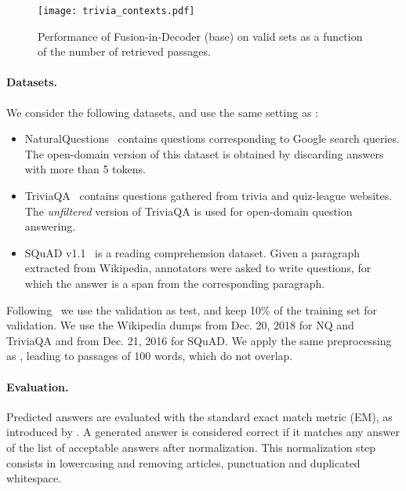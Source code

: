 \documentclass[11pt,a4paper]{article}
\begin{document}
\begin{figure*}[t]
\begin{center} 
\texttt{[image: trivia\_contexts.pdf]}
\caption{Performance of Fusion-in-Decoder (base) on valid sets as a function of the number of retrieved passages.}
\label{fig:contextscaling}
\end{center}
\end{figure*}

\paragraph{Datasets.}
We consider the following datasets, and use the same setting as \citet{lee2019latent}:
\begin{itemize}
\item NaturalQuestions~\citep{kwiatkowski2019NQ} contains questions corresponding to Google search queries. 
The open-domain version of this dataset is obtained by discarding answers with more than 5 tokens.
\item TriviaQA~\citep{JoshiTriviaQA2017} contains questions gathered from trivia and quiz-league websites.
The \emph{unfiltered} version of TriviaQA is used for open-domain question answering.
\item SQuAD v1.1~\citep{rajpurkar2016squad} is a reading comprehension dataset. 
Given a paragraph extracted from Wikipedia, annotators were asked to write questions, for which the answer is a span from the corresponding paragraph.
\end{itemize}
Following~\citet{lee2019latent} we use the validation as test, and keep 10\% of the training set for validation.
We use the Wikipedia dumps from Dec. 20, 2018 for NQ and TriviaQA and from Dec. 21, 2016 for SQuAD.
We apply the same preprocessing as \citet{chen2017reading,karpukhin2020dense}, leading to passages of 100 words, which do not overlap.

\paragraph{Evaluation.}
Predicted answers are evaluated with the standard exact match metric (EM), as introduced by \citet{rajpurkar2016squad}.
A generated answer is considered correct if it matches any answer of the list of acceptable answers after normalization.
This normalization step consists in lowercasing and removing articles, punctuation and duplicated whitespace.
\end{document}
